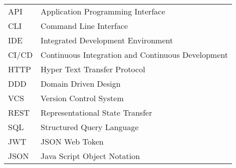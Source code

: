 \begin{longtable}{p{3cm}p{10cm}}
    API&Application Programming Interface\\
    CLI&Command Line Interface\\
    IDE&Integrated Development Environment\\
    CI/CD&Continuous Integration and Continuous Development\\
    HTTP&Hyper Text Transfer Protocol\\
    DDD&Domain Driven Design\\
    VCS&Version Control System\\
    REST&Representational State Transfer\\
    SQL&Structured Query Language\\
    JWT&JSON Web Token\\
    JSON&Java Script Object Notation\\
\end{longtable}
\addtocounter{table}{-1}
